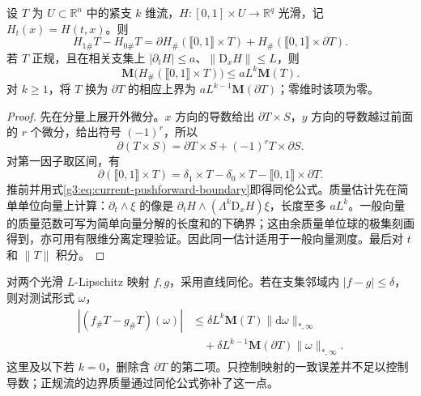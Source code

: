 \begin{proposition}\label{g3:prop:current-homotopy}
	设 \(T\) 为 \(U\subset\mathbb R^n\) 中的紧支 \(k\) 维流，\(H:[0,1]\times U\to\mathbb R^q\) 光滑，记 \(H_t(x)=H(t,x)\)。则
	\begin{equation}\label{g3:eq:current-homotopy}
		H_{1\#}T-H_{0\#}T
		=\partial H_\#(\lBrack0,1\rBrack\times T)
		+H_\#(\lBrack0,1\rBrack\times\partial T).
	\end{equation}
	若 \(T\) 正规，且在相关支集上 \(|\partial_tH|\le a\)、\(\|\mathrm D_xH\|\le L\)，则
	\[
		\mathbf M\bigl(H_\#(\lBrack0,1\rBrack\times T)\bigr)
		\le aL^k\mathbf M(T).
	\]
	对 \(k\ge1\)，将 \(T\) 换为 \(\partial T\) 的相应上界为 \(aL^{k-1}\mathbf M(\partial T)\)；零维时该项为零。
\end{proposition}
\begin{proof}
	先在分量上展开外微分。\(x\) 方向的导数给出 \(\partial T\times S\)，\(y\) 方向的导数越过前面的 \(r\) 个微分，给出符号 \((-1)^r\)，所以
	\[
		\partial(T\times S)=\partial T\times S+(-1)^rT\times\partial S.
	\]
	对第一因子取区间，有
	\[
		\partial(\lBrack0,1\rBrack\times T)
		=\delta_1\times T-\delta_0\times T
		-\lBrack0,1\rBrack\times\partial T.
	\]
	推前并用式\eqref{g3:eq:current-pushforward-boundary}即得同伦公式。质量估计先在简单单位向量上计算：\(\partial_t\wedge\xi\) 的像是
	\(\partial_tH\wedge(\Lambda^k\mathrm D_xH)\xi\)，长度至多 \(aL^k\)。一般向量的质量范数可写为简单向量分解的长度和的下确界；这由余质量单位球的极集刻画得到，亦可用有限维分离定理验证。因此同一估计适用于一般向量测度。最后对 \(t\) 和 \(\|T\|\) 积分。
\end{proof}

对两个光滑 \(L\)-Lipschitz 映射 \(f,g\)，采用直线同伦。若在支集邻域内 \(|f-g|\le\delta\)，则对测试形式 \(\omega\)，
\begin{equation}\label{g3:eq:current-uniform-map-estimate}
\begin{aligned}
	|(f_\#T-g_\#T)(\omega)|
	&\le\delta L^k\mathbf M(T)\|\mathrm d\omega\|_{*,\infty}\\
	&\quad+\delta L^{k-1}\mathbf M(\partial T)\|\omega\|_{*,\infty}.
\end{aligned}
\end{equation}
这里及以下若 \(k=0\)，删除含 \(\partial T\) 的第二项。只控制映射的一致误差并不足以控制导数；正规流的边界质量通过同伦公式弥补了这一点。


